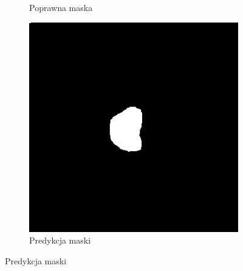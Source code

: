 \documentclass[a4paper,11pt,twoside]{report}
\theoremstyle{definition}
\begin{document}
\begin{figure}[htb]
\begin{subfigure}{0.25\textwidth}
		\caption{Poprawna maska}
		\label{fig:2}
	\end{subfigure}\hfil %
	\begin{subfigure}{0.25\textwidth}
		\includegraphics[width=\linewidth,angle=270,origin=c]{segmentation/pred_mask_1.png}
		\caption{Predykcja maski}
		\label{fig:3}
	\end{subfigure}
	

\end{figure}
\end{document}
